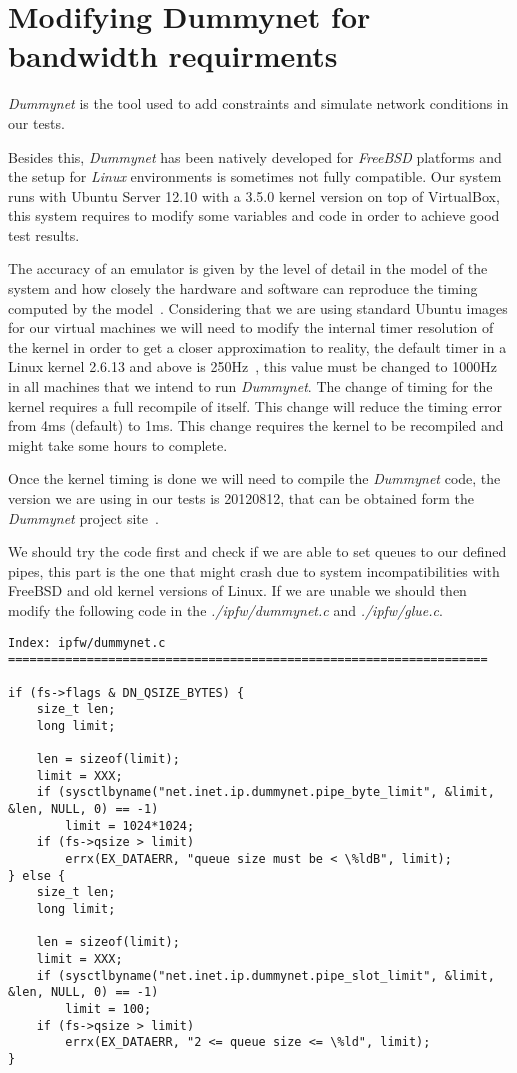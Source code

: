 \section{Modifying Dummynet for bandwidth requirments}
\label{sec:dummynet}

\thispagestyle{empty}

{\it Dummynet} is the tool used to add constraints and simulate network conditions in our tests. 

Besides this, {\it Dummynet} has been natively developed for {\it FreeBSD} platforms and the setup for {\it Linux} environments is sometimes not fully compatible. Our system runs with Ubuntu Server 12.10 with a 3.5.0 kernel version on top of VirtualBox, this system requires to modify some variables and code in order to achieve good test results.

The accuracy of an emulator is given by the level of detail in the model of the system and how closely the hardware and software can reproduce the timing computed by the model~\cite{dummynetRevisited}. Considering that we are using standard Ubuntu images for our virtual machines we will need to modify the internal timer resolution of the kernel in order to get a closer approximation to reality, the default timer in a Linux kernel  2.6.13 and above is 250Hz~\cite{linuxKernelTime}, this value must be changed to 1000Hz in all machines that we intend to run {\it Dummynet}. The change of timing for the kernel requires a full recompile of itself. This change will reduce the timing error from 4ms (default) to 1ms. This change requires the kernel to be recompiled and might take some hours to complete.

Once the kernel timing is done we will need to compile the {\it Dummynet} code, the version we are using in our tests is 20120812, that can be obtained form the {\it Dummynet} project site~\cite{dummynetTool}.

We should try the code first and check if we are able to set queues to our defined pipes, this part is the one that might crash due to system incompatibilities with FreeBSD and old kernel versions of Linux.  If we are unable we should then modify the following code in the {\it ./ipfw/dummynet.c} and {\it ./ipfw/glue.c}.

\lstset{language=C}
\begin{lstlisting}
Index: ipfw/dummynet.c
===================================================================

if (fs->flags & DN_QSIZE_BYTES) {
	size_t len;
	long limit;

	len = sizeof(limit);
	limit = XXX;
	if (sysctlbyname("net.inet.ip.dummynet.pipe_byte_limit", &limit, &len, NULL, 0) == -1)
		limit = 1024*1024;
	if (fs->qsize > limit)
		errx(EX_DATAERR, "queue size must be < \%ldB", limit);
} else {
	size_t len;
	long limit;

	len = sizeof(limit);
	limit = XXX;
	if (sysctlbyname("net.inet.ip.dummynet.pipe_slot_limit", &limit, &len, NULL, 0) == -1)
		limit = 100;
	if (fs->qsize > limit)
		errx(EX_DATAERR, "2 <= queue size <= \%ld", limit);
}
\end{lstlisting}

